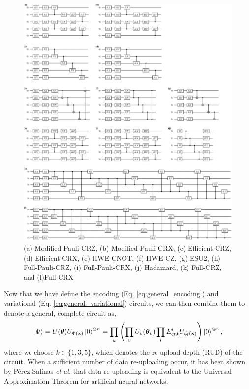 \documentclass[journal=jacsat,manuscript=article]{achemso}
\begin{document}
\begin{figure}[H]
	\centering
	\includegraphics[width=\textwidth]{../images/ansatz/quantikz/combined.png}
	\caption{(a) Modified-Pauli-CRZ, (b) Modified-Pauli-CRX, (c) Efficient-CRZ, (d) Efficient-CRX, (e) HWE-CNOT, (f) HWE-CZ,  (g) ESU2, (h) Full-Pauli-CRZ, (i) Full-Pauli-CRX, (j) Hadamard, (k) Full-CRZ, and (l)Full-CRX}
	\label{fig:ansatz}
\end{figure}

Now that we have define the encoding (Eq. \ref{eq:general_encoding}) and variational (Eq. \ref{eq:general_variational}) circuits, we can then combine them to denote a general, complete circuit as,
\begin{equation}
	\ket{\Psi} = U(\bm{\theta}) U_{\Phi(\mathbf{x})}\ket{0}^{\otimes n} = \prod_{k}
	\left( \prod_{v} U_{v}(\bm{\theta}_{v}) \prod_{l} E_{\text{ent}}^{l} U_{\phi_{l}(\mathbf{x})} \right)  \ket{0}^{\otimes n},
\end{equation}
where we choose $k \in \{1, 3, 5\}$, which denotes the re-upload depth (RUD) of the circuit.
When a sufficient number of data re-uploading occur, it has been shown by P\'{e}rez-Salinas \textit{et al.} that data re-uploading is equivalent to the Universal Approximation Theorem for artificial neural networks.\cite{perez-salinas_data_2020}
\end{document}
